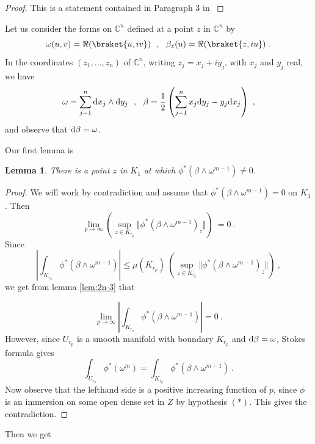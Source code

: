 \documentclass[12pt,reqno]{amsart}
\newtheorem{lemma}[theorem]{Lemma}
\renewcommand{\leq}{\leqslant}
\renewcommand{\d}{{\rm d}}
\begin{document}
\begin{proof} This is a statement contained in Paragraph 3 in \cite{Hardt:1983aa}  
\end{proof}


 Let us consider the  forms on $\mathbb C^n$ defined at a point $z$ in $\mathbb C^n$ by 
$$
\omega(u,v)=\Re(\braket{u,iv})\ \ , \ \ \beta_z(u)=\Re(\braket{z,iu})\ .
$$
In the coordinates $(z_1,\ldots,z_n)$ of $\mathbb C^n$, writing $z_j=x_j+iy_j$, with $x_j$ and $y_j$ real, we have 
$$
\omega=\sum_{j=1}^{n}\d x_j\wedge \d y_j\ \  ,\  \ \beta=\frac{1}{2}\left(\sum_{j=1}^{n} x_j \d y_j- y_j\d x_j\right)\ ,
$$
and observe that $\d\beta=\omega$.

Our first lemma is
\begin{lemma}
	There is a point $z$ in $K_1$ at which $\phi^*(\beta\wedge
	\omega^{m-1})\not=0$.
\end{lemma}
\begin{proof} We will work by contradiction and assume that $\phi^*(\beta\wedge\omega^{m-1})=0$ on $K_1$. Then $$
\lim_{p\to\infty}\left(\sup_{z\in K_{r_p}} \Vert \phi^*(\beta\wedge\omega^{m-1})_z\Vert\right)\  =0\ .
$$
Since  
$$
\left\vert\int_{K_{r_p}}\phi^*(\beta\wedge\omega^{m-1})\right\vert \leq \mu(K_{r_p})\ \left(\sup_{z\in K_{r_p}} \Vert \phi^*(\beta\wedge\omega^{m-1})_z\Vert\right)\ ,
$$
we get from lemma \ref{lem:2n-3} that 

$$
\lim_{p\to\infty}\left\vert\int_{K_{r_p}}\phi^*(\beta\wedge\omega^{m-1})\right\vert =0\ .
$$
However, since $U_{r_p}$ is a smooth manifold with boundary $K_{r_p}$ and $\d\beta=\omega$,  Stokes formula gives
$$
\int_{U_{r_p}}\phi^*(\omega^{m})= \int_{K_{r_p}}\phi^*(\beta\wedge\omega^{m-1})\ .
$$
Now observe that the lefthand side is a positive increasing function of $p$, since $\phi$ is an immersion on some open dense set in $Z$ by hypothesis $(*)$. This gives the contradiction.
\end{proof}

Then we get 
\end{document}
